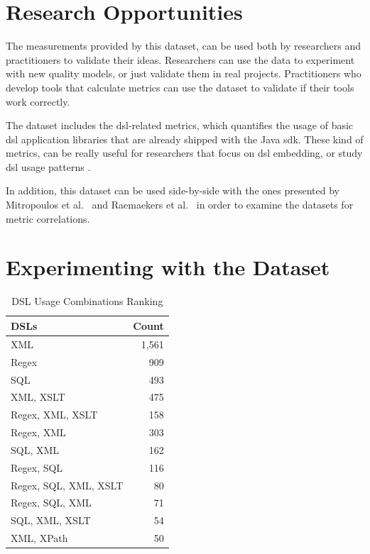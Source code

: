\documentclass{sig-alternate}
\begin{document}
\section{Research Opportunities}
\label{sec:research-opportunities}

The measurements provided by this dataset, can be used both by researchers and practitioners to validate their ideas. Researchers can use the data to experiment with new quality models, or just validate them in real projects. Practitioners who develop tools that calculate metrics can use the dataset to validate if their tools work correctly.

The dataset includes the {\sc dsl}-related metrics, which quantifies the usage of basic {\sc dsl} application libraries that are already shipped with the Java {\sc sdk}. These kind of metrics, can be really useful for researchers that focus on {\sc dsl} embedding, or study {\sc dsl} usage patterns \cite{KARA14}.

In addition, this dataset can be used side-by-side with the ones presented by Mitropoulos et al.~\cite{HP04} and Raemaekers et al.~\cite{RDV13} in order to examine the datasets for metric correlations.

\section{Experimenting with the Dataset}
\label{sec:dsl}

\begin{table}
\centering
\caption{DSL Usage Combinations Ranking}
\label{tbl:dsl-top-usage}
\begin{tabular}{l r}
 \hline
\textbf{DSLs} & \textbf{Count}\\
\hline
XML & 1,561\\
Regex & 909\\
SQL & 493\\
XML, XSLT & 475\\
Regex, XML, XSLT & 158\\
Regex, XML & 303\\
SQL, XML & 162\\
Regex, SQL & 116\\
Regex, SQL, XML, XSLT & 80\\
Regex, SQL, XML & 71\\
SQL, XML, XSLT & 54\\
XML, XPath & 50\\
\hline
\end{tabular}
\end{table}
\end{document}
